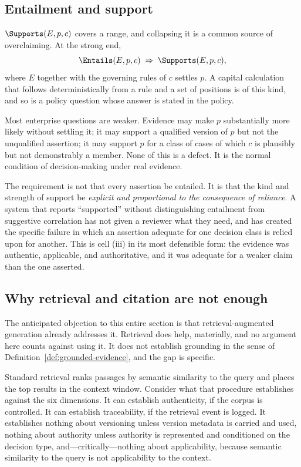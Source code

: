 \subsection{Entailment and support}
\label{sec:entails-supports}

$\Supports(E, p, c)$ covers a range, and collapsing it is a common source of
overclaiming. At the strong end,
\begin{equation}
  \Entails(E, p, c) \;\Rightarrow\; \Supports(E, p, c),
  \label{eq:entails}
\end{equation}
where $E$ together with the governing rules of $c$ settles $p$. A capital
calculation that follows deterministically from a rule and a set of positions is of
this kind, and so is a policy question whose answer is stated in the policy.

Most enterprise questions are weaker. Evidence may make $p$ substantially more
likely without settling it; it may support a qualified version of $p$ but not the
unqualified assertion; it may support $p$ for a class of cases of which $c$ is
plausibly but not demonstrably a member. None of this is a defect. It is the normal
condition of decision-making under real evidence.

The requirement is not that every assertion be entailed. It is that the kind and
strength of support be \emph{explicit and proportional to the consequence of
reliance}. A system that reports ``supported'' without distinguishing entailment
from suggestive correlation has not given a reviewer what they need, and has
created the specific failure in which an assertion adequate for one decision class
is relied upon for another. This is cell (iii) in its most defensible form: the
evidence was authentic, applicable, and authoritative, and it was adequate for a
weaker claim than the one asserted.

\subsection{Why retrieval and citation are not enough}
\label{sec:retrieval-insufficient}

The anticipated objection to this entire section is that retrieval-augmented
generation \citep{lewis2020} already addresses it. Retrieval does help, materially,
and no argument here counts against using it. It does not establish grounding in
the sense of Definition~\ref{def:grounded-evidence}, and the gap is specific.

Standard retrieval ranks passages by semantic similarity to the query and places
the top results in the context window. Consider what that procedure establishes
against the six dimensions. It can establish authenticity, if the corpus is
controlled. It can establish traceability, if the retrieval event is logged. It
establishes nothing about versioning unless version metadata is carried and used,
nothing about authority unless authority is represented and conditioned on the
decision type, and---critically---nothing about applicability, because semantic
similarity to the query is not applicability to the context.

